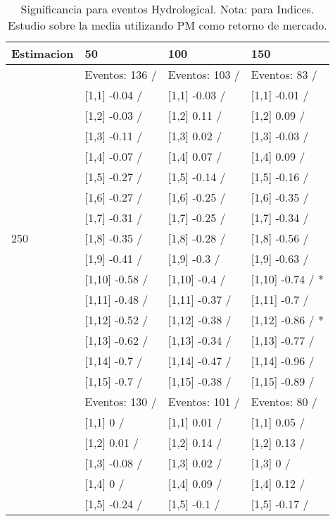 \begin{table}

\caption{Significancia para eventos Hydrological. Nota: para Indices. Estudio sobre la media utilizando PM como retorno de mercado.}
\centering
\begin{tabular}[t]{llll}
\toprule
Estimacion & 50 & 100 & 150\\
\midrule
 & Eventos:  136 / & Eventos:  103 / & Eventos:  83 /\\
 & {}[1,1] -0.04  / & {}[1,1] -0.03  / & {}[1,1] -0.01  /\\
 & {}[1,2] -0.03  / & {}[1,2] 0.11  / & {}[1,2] 0.09  /\\
 & {}[1,3] -0.11  / & {}[1,3] 0.02  / & {}[1,3] -0.03  /\\
 & {}[1,4] -0.07  / & {}[1,4] 0.07  / & {}[1,4] 0.09  /\\
\addlinespace
 & {}[1,5] -0.27  / & {}[1,5] -0.14  / & {}[1,5] -0.16  /\\
 & {}[1,6] -0.27  / & {}[1,6] -0.25  / & {}[1,6] -0.35  /\\
 & {}[1,7] -0.31  / & {}[1,7] -0.25  / & {}[1,7] -0.34  /\\
250 & {}[1,8] -0.35  / & {}[1,8] -0.28  / & {}[1,8] -0.56  /\\
 & {}[1,9] -0.41  / & {}[1,9] -0.3  / & {}[1,9] -0.63  /\\
\addlinespace
 & {}[1,10] -0.58  / & {}[1,10] -0.4  / & {}[1,10] -0.74  / *\\
 & {}[1,11] -0.48  / & {}[1,11] -0.37  / & {}[1,11] -0.7  /\\
 & {}[1,12] -0.52  / & {}[1,12] -0.38  / & {}[1,12] -0.86  / *\\
 & {}[1,13] -0.62  / & {}[1,13] -0.34  / & {}[1,13] -0.77  /\\
 & {}[1,14] -0.7  / & {}[1,14] -0.47  / & {}[1,14] -0.96  /\\
\addlinespace
 & {}[1,15] -0.7  / & {}[1,15] -0.38  / & {}[1,15] -0.89  /\\
 & Eventos:  130 / & Eventos:  101 / & Eventos:  80 /\\
 & {}[1,1] 0  / & {}[1,1] 0.01  / & {}[1,1] 0.05  /\\
 & {}[1,2] 0.01  / & {}[1,2] 0.14  / & {}[1,2] 0.13  /\\
 & {}[1,3] -0.08  / & {}[1,3] 0.02  / & {}[1,3] 0  /\\
\addlinespace
 & {}[1,4] 0  / & {}[1,4] 0.09  / & {}[1,4] 0.12  /\\
 & {}[1,5] -0.24  / & {}[1,5] -0.1  / & {}[1,5] -0.17  /\\

\end{tabular}
\end{table}
